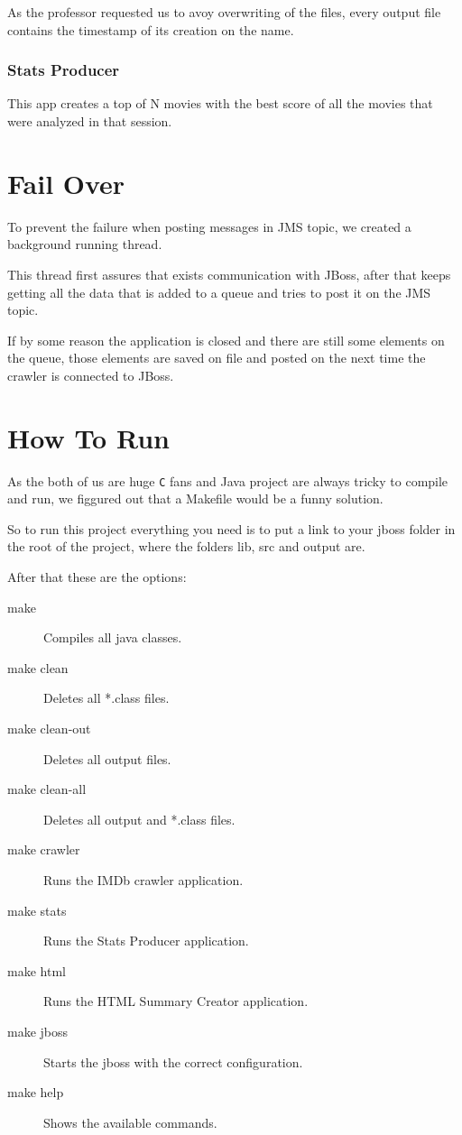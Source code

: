 \documentclass[12pt]{article}
\begin{document}
As the professor requested us to avoy overwriting of the files, every output file contains the timestamp of its creation on the name.

\subsubsection{Stats Producer}
\indent \indent This app creates a top of N movies with the best score of all the movies that were analyzed in that session.

\section{Fail Over}
\indent \indent To prevent the failure when posting messages in JMS topic, we created a background running thread.

This thread first assures that exists communication with JBoss, after that keeps getting all the data that is added to a queue and tries to post it on the JMS topic.

If by some reason the application is closed and there are still some elements on the queue, those elements are saved on file and posted on the next time the crawler is connected to JBoss.

\clearpage
\section{How To Run}
\indent \indent As the both of us are huge \texttt{C} fans and Java project are always tricky to compile and run, we figgured out that a Makefile would be a funny solution.

So to run this project everything you need is to put a link to your jboss folder in the root of the project, where the folders lib, src and output are.

After that these are the options:
\begin{description}
	\item [make]
		Compiles all java classes.
	\item [make clean]
		Deletes all *.class files.
	\item [make clean-out]
		Deletes all output files.
	\item [make clean-all]
		Deletes all output and *.class files.
	\item [make crawler]
		Runs the IMDb crawler application.
	\item [make stats]
		Runs the Stats Producer application.
	\item [make html]
		Runs the HTML Summary Creator application.
	\item [make jboss]
		Starts the jboss with the correct configuration.
	\item [make help]
		Shows the available commands.
\end{description}
\end{document}
